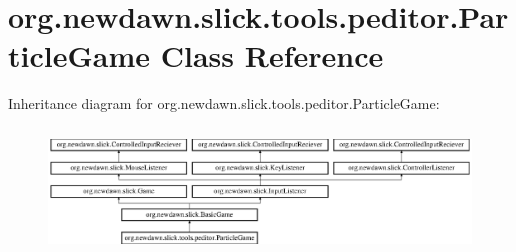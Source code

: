 \hypertarget{classorg_1_1newdawn_1_1slick_1_1tools_1_1peditor_1_1_particle_game}{}\section{org.\+newdawn.\+slick.\+tools.\+peditor.\+Particle\+Game Class Reference}
\label{classorg_1_1newdawn_1_1slick_1_1tools_1_1peditor_1_1_particle_game}
Inheritance diagram for org.\+newdawn.\+slick.\+tools.\+peditor.\+Particle\+Game\+:\begin{figure}[H]
\begin{center}
\leavevmode
\includegraphics[height=3.369434cm]{classorg_1_1newdawn_1_1slick_1_1tools_1_1peditor_1_1_particle_game}
\end{center}
\end{figure}
